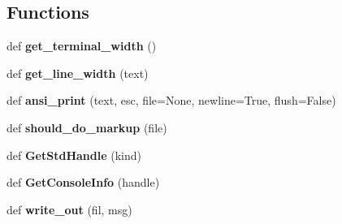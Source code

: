 \subsection*{Functions}
\begin{DoxyCompactItemize}
\item 
\mbox{\label{namespacepy_1_1__io_1_1terminalwriter_adc58f4da9f8c7fcd39732db5ffce099d}} 
def {\bfseries get\+\_\+terminal\+\_\+width} ()
\item 
\mbox{\label{namespacepy_1_1__io_1_1terminalwriter_a151cfca4aeb5d8aff47e0c0841dbb9f4}} 
def {\bfseries get\+\_\+line\+\_\+width} (text)
\item 
\mbox{\label{namespacepy_1_1__io_1_1terminalwriter_a7b0d3858cd6d9ac838b6f651a9d5ac60}} 
def {\bfseries ansi\+\_\+print} (text, esc, file=None, newline=True, flush=False)
\item 
\mbox{\label{namespacepy_1_1__io_1_1terminalwriter_a122f25af7ca8a0e7ef0276c9aae26d4e}} 
def {\bfseries should\+\_\+do\+\_\+markup} (file)
\item 
\mbox{\label{namespacepy_1_1__io_1_1terminalwriter_a7eade46da32f5167e739aa60d0a3cd49}} 
def {\bfseries Get\+Std\+Handle} (kind)
\item 
\mbox{\label{namespacepy_1_1__io_1_1terminalwriter_aab49fc7468e41016679855eb3dab6462}} 
def {\bfseries Get\+Console\+Info} (handle)
\item 
\mbox{\label{namespacepy_1_1__io_1_1terminalwriter_aceb3603720683e4591abbe4f8ebd1afd}} 
def {\bfseries write\+\_\+out} (fil, msg)
\end{DoxyCompactItemize}
